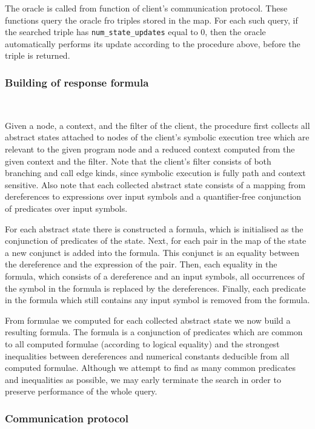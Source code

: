 \documentclass[envcountsame]{llncs}
\begin{document}
The oracle is called from function of client's communication protocol. These
functions query the oracle fro triples stored in the map. For each such query,
if the searched triple has \texttt{num\_state\_updates} equal to 0, then the
oracle automatically performs its update according to the procedure above,
before the triple is returned.

\subsubsection{Building of response formula}~\\
\label{sec:BuildingResponseFormulaSE}

Given a node, a context, and the filter of the client, the procedure first
collects all abstract states attached to nodes of the client's symbolic
execution tree which are relevant to the given program node and a reduced
context computed from the given context and the filter. Note that the client's
filter consists of both branching and call edge kinds, since symbolic execution
is fully path and context sensitive. Also note that each collected abstract
state consists of a mapping from dereferences to expressions over input symbols
and a quantifier-free conjunction of predicates over input symbols.

For each abstract state there is constructed a formula, which is initialised as
the conjunction of predicates of the state. Next, for each pair in the map of
the state a new conjunct is added into the formula. This conjunct is an equality
between the dereference and the expression of the pair. Then, each equality in
the formula, which consists of a dereference and an input symbols, all
occurrences of the symbol in the formula is replaced by the dereferences.
Finally, each predicate in the formula which still contains any input symbol is
removed from the formula.

From formulae we computed for each collected abstract state we now build a
resulting formula. The formula is a conjunction of predicates which are common
to all computed formulae (according to logical equality) and the strongest
inequalities between dereferences and numerical constants deducible from all
computed formulae. Although we attempt to find as many common predicates and
inequalities as possible, we may early terminate the search in order to preserve
performance of the whole query.

\subsubsection{Communication protocol}~\\
\label{sec:CommunicationSymbolicExecution}
\end{document}
